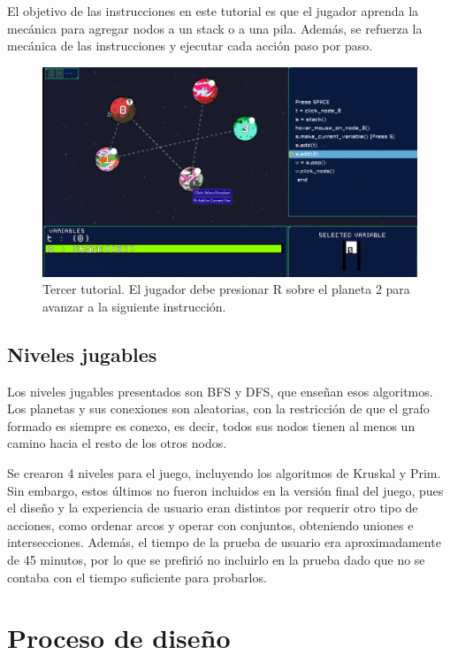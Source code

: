 El objetivo de las instrucciones en este tutorial es que el jugador aprenda la mecánica para agregar nodos a un stack o a una pila.
Además, se refuerza la mecánica de las instrucciones y ejecutar cada acción paso por paso.


\begin{figure}[h]
	\centering
	\includegraphics[scale=0.3]{imagenes/ThirdTutorialAddingNode.png}
	\caption{Tercer tutorial. El jugador debe presionar R sobre el planeta 2 para avanzar a la siguiente instrucción.}
	\label{ThirdTutorialAddingNodesToStacks}
\end{figure}


\subsection{Niveles jugables}

Los niveles jugables presentados son BFS y DFS, que enseñan esos algoritmos. Los planetas y sus conexiones son aleatorias, con la restricción de que el grafo formado es siempre es conexo, es decir, todos sus nodos tienen al menos un camino hacia el resto de los otros nodos.

Se crearon 4 niveles para el juego, incluyendo los algoritmos de Kruskal y Prim. Sin embargo, estos últimos no fueron incluidos en la versión final del juego, pues el diseño y la experiencia de usuario eran distintos por requerir otro tipo de acciones, como ordenar arcos y operar con conjuntos, obteniendo uniones e intersecciones. Además, el tiempo de la prueba de usuario era aproximadamente de 45 minutos, por lo que se prefirió no incluirlo en la prueba dado que no se contaba con el tiempo suficiente para probarlos.


\section{Proceso de diseño}

